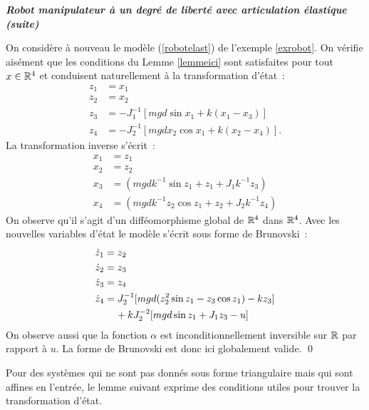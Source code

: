 \begin{exemple}{\bf \em Robot manipulateur à un degré de liberté avec articulation élastique (suite)}

On considère à nouveau le modèle (\ref{robotelast}) de l'exemple \ref{exrobot}. On vérifie aisément que les conditions du Lemme \ref{lemmeici} sont satisfaites pour tout $x \in \mathbb{R}^4$ et conduisent naturellement à la transformation d'état~:
\begin{equation*} \begin{split} 
z_1 &= x_1 \\
z_2 &= x_2 \\
z_3 &= -J_1^{-1}[mgd\sin x_1 + k(x_1 -x_3)] \\
z_4 &= -J_2^{-1}[mgdx_2 \cos x_1 + k(x_2 - x_4)].
\end{split} \end{equation*}
La transformation inverse s'écrit~:
\begin{equation*} \begin{split} 
x_1 &= z_1 \\
x_2 &= z_2 \\
x_3 &= (mgdk^{-1} \sin z_1 + z_1 + J_1k^{-1}z_3) \\
x_4 &= (mgdk^{-1} z_2 \cos z_1 + z_2 + J_2k^{-1}z_4) 
\end{split} \end{equation*}
On observe qu'il s'agit d'un difféomorphisme global de $\mathbb{R}^4$ dans $\mathbb{R}^4$. Avec les nouvelles variables d'état le modèle s'écrit sous forme de Brunovski~:
\begin{equation*} \begin{split} 
\dot z_1 &= z_2 \\
\dot z_2 &= z_3 \\
\dot z_3 &= z_4 \\
\dot z_4 &= J_2^{-1}[mgd(z_2^2 \sin z_1 - z_3 \cos z_1) -k z_3] \\ & \hh \hh + kJ_2^{-2}[mgd\sin z_1 + J_1z_3 - u]
\end{split} \end{equation*}
On observe aussi que la fonction $\alpha$ est inconditionnellement inversible sur $\mathbb{R}$ par rapport à $u$. La forme de Brunovski est donc ici globalement valide. \qed
\end{exemple}
Pour des systèmes qui ne sont pas donnés sous forme triangulaire mais qui sont affines en l'entrée, le lemme suivant exprime des conditions utiles pour trouver la transformation d'état.
